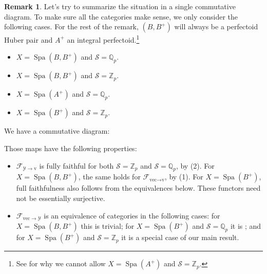 \documentclass[10pt,twoside]{article}
\numberwithin{equation}{section}
\theoremstyle{plain}
\theoremstyle{definition}
\newtheorem{myrem}[mythm]{Remark}
\DeclareMathOperator{\Spa}{Spa}
\newcommand{\ZZ}{\mathbb{Z}}
\newcommand{\QQ}{\mathbb{Q}}
\newcommand{\MCF}{\mathcal{F}}
\newcommand{\MCS}{\mathcal{S}}
\newcommand{\MCY}{\mathcal{Y}}
\let \diamond \Diamond
\begin{document}
\begin{myrem}\label{baseChangeDiagrams}
Let's try to summarize the situation in a single commutative diagram. To make sure all the categories make sense, we only consider the following cases. For the rest of the remark, \((B,B^+)\) will always be a perfectoid Huber pair and \(A^+\) an integral perfectoid.\footnote{See  for why we cannot allow \(X=\Spa(A^+)\) and \(\MCS=\ZZ_p\).}
\begin{itemize}
    \item \(X=\Spa(B,B^+)\) and \(\MCS=\QQ_p\).
    \item \(X=\Spa(B,B^+)\) and \(\MCS=\ZZ_p\).
    \item \(X=\Spa(A^+)\) and \(\MCS=\QQ_p\).
    \item \(X=\Spa(B^+)\) and \(\MCS=\ZZ_p\).
\end{itemize}

We have a commutative diagram:
    
\begin{center}
\end{center}

Those maps have the following properties:
\begin{itemize}
    \item \(\MCF_{\MCY \to \text{v}}\) is fully faithful for both \(\MCS=\ZZ_p\) and \(\MCS=\QQ_p\), by  (2). For \(X=\Spa(B,B^+)\), the same holds for \(\MCF_{\text{vec} \to \text{v}}\), by (1). For \(X=\Spa(B^+)\), full faithfulness also follows from the equivalences below. These functors need not be essentially surjective.
   \item \(\MCF^{}_{\text{vec} \to \MCY}\) is an equivalence of categories in the following cases: for \(X=\Spa(B,B^+)\) this is trivial; for \(X=\Spa(B^+)\) and \(\MCS=\QQ_p\) it is ; and for \(X=\Spa(B^+)\) and \(\MCS=\ZZ_p\) it is a special case of our main result.
\end{itemize}
\end{myrem}
\end{document}
